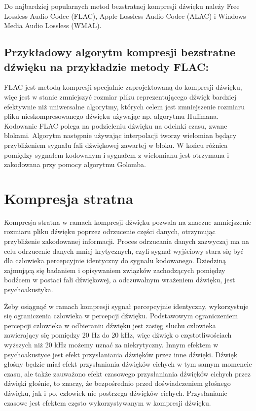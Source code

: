 \documentclass[a4paper,12pt]{extarticle}
\begin{document}
Do najbardziej popularnych metod bezstratnej kompresji dźwięku należy Free Lossless Audio Codec (FLAC), Apple Lossless Audio Codec (ALAC) i Windows Media Audio Lossless (WMAL).

\subsection*{Przykładowy algorytm kompresji bezstratne dźwięku na przykładzie metody FLAC:}
FLAC jest metodą kompresji specjalnie zaprojektowaną do kompresji dźwięku, więc jest w stanie zmniejszyć rozmiar pliku reprezentującego dźwięk bardziej efektywnie niż uniwersalne algorytmy, których celem jest zmniejszenie rozmiaru pliku nieskompresowanego dźwięku używając np. algorytmu Huffmana.
Kodowanie FLAC polega na podzieleniu dźwięku na odcinki czasu, zwane blokami. Algorytm następnie używając interpolacji tworzy wielomian będący przybliżeniem sygnału fali dźwiękowej zawartej w bloku. W końcu różnica pomiędzy sygnałem kodowanym i sygnałem z wielomianu jest otrzymana i zakodowana przy pomocy algorytmu Golomba.

\section*{Kompresja stratna}

Kompresja stratna w ramach kompresji dźwięku pozwala na znaczne zmniejszenie rozmiaru pliku dźwięku poprzez odrzucenie części danych, otrzymując przybliżenie zakodowanej informacji. Proces odrzucania danych zazwyczaj ma na celu odrzucenie danych mniej krytycznych, czyli sygnał wyjściowy stara się być dla człowieka percepcyjnie identyczny do sygnału kodowanego. Dziedziną zajmującą się badaniem i opisywaniem związków zachodzących pomiędzy bodźcem w postaci fali dźwiękowej, a odczuwalnym wrażeniem dźwięku, jest psychoakustyka.

Żeby osiągnąć w ramach kompresji sygnał percepcyjnie identyczny, wykorzystuje się ograniczenia człowieka w percepcji dźwięku. Podstawowym ograniczeniem percepcji człowieka w odbieraniu dźwięku jest zasięg słuchu człowieka zawierający się pomiędzy 20 Hz do 20 kHz, więc dźwięk o częstotliwościach wyższych niż 20 kHz możemy uznać za niekrytyczny. Innym efektem w psychoakustyce jest efekt przysłaniania dźwięków przez inne dźwięki. Dźwięk głośny będzie miał efekt przysłaniania dźwięków cichych w tym samym momencie czasu, ale także zauważono efekt czasowego przysłaniania dźwięków cichych przez dźwięki głośnie, to znaczy, że bezpośrednio przed doświadczeniem głośnego dźwięku, jak i po, człowiek nie postrzega dźwięków cichych. Przysłanianie czasowe jest efektem często wykorzystywanym w kompresji dźwięku.
\end{document}
